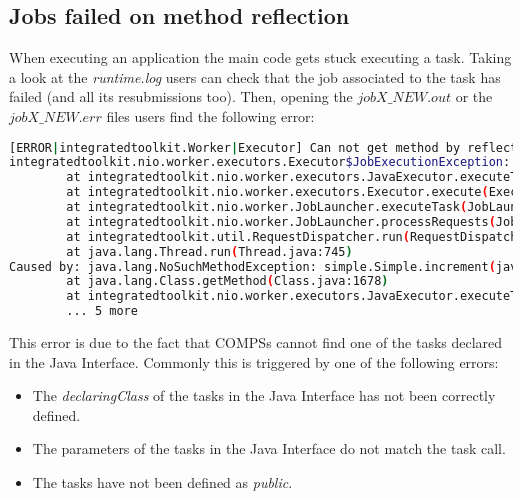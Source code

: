 
\subsection{Jobs failed on method reflection}
When executing an application the main code gets stuck executing a task. Taking a look at the \textit{runtime.log} users can check
that the job associated to the task has failed (and all its resubmissions too). Then, opening the \textit{$jobX\_NEW.out$} or the
\textit{$jobX\_NEW.err$} files users find the following error:

\begin{lstlisting}[language=bash]
[ERROR|integratedtoolkit.Worker|Executor] Can not get method by reflection
integratedtoolkit.nio.worker.executors.Executor$JobExecutionException: Can not get method by reflection
        at integratedtoolkit.nio.worker.executors.JavaExecutor.executeTask(JavaExecutor.java:142)
        at integratedtoolkit.nio.worker.executors.Executor.execute(Executor.java:42)
        at integratedtoolkit.nio.worker.JobLauncher.executeTask(JobLauncher.java:46)
        at integratedtoolkit.nio.worker.JobLauncher.processRequests(JobLauncher.java:34)
        at integratedtoolkit.util.RequestDispatcher.run(RequestDispatcher.java:46)
        at java.lang.Thread.run(Thread.java:745)
Caused by: java.lang.NoSuchMethodException: simple.Simple.increment(java.lang.String)
        at java.lang.Class.getMethod(Class.java:1678)
        at integratedtoolkit.nio.worker.executors.JavaExecutor.executeTask(JavaExecutor.java:140)
        ... 5 more
\end{lstlisting}

This error is due to the fact that COMPSs cannot find one of the tasks declared in the Java Interface. Commonly this is triggered by
one of the following errors:

\begin{itemize}
 \item The \textit{declaringClass} of the tasks in the Java Interface has not been correctly defined.
 \item The parameters of the tasks in the Java Interface do not match the task call.
 \item The tasks have not been defined as \textit{public}.
\end{itemize}

